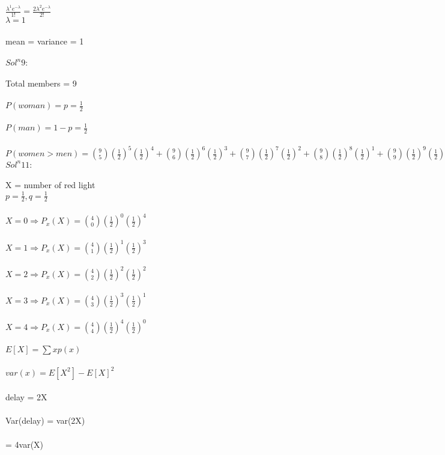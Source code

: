 \documentclass{article}
\begin{document}
$\frac{\lambda ^1 e^{-\lambda }}{1!} = \frac{2\lambda ^2 e^{-\lambda }}{2!}$\\

$\lambda =1$\\\\
mean = variance = 1 \\\\

\textbf{$Sol^n 9:$} \\\\
Total members = 9 \\\\
$P\left ( woman \right ) = p =\frac{1}{2}$ \\\\
$P\left ( man \right ) = 1-p =\frac{1}{2}$ \\\\
$P\left (women> men \right ) = \binom{9}{5}\left ( \frac{1}{2} \right )^5\left ( \frac{1}{2} \right )^4 + \binom{9}{6}\left ( \frac{1}{2} \right )^6\left ( \frac{1}{2} \right )^3 + \binom{9}{7}\left ( \frac{1}{2} \right )^7\left ( \frac{1}{2} \right )^2 + \binom{9}{8}\left ( \frac{1}{2} \right )^8\left ( \frac{1}{2} \right )^1 + \binom{9}{9}\left ( \frac{1}{2} \right )^9\left ( \frac{1}{2} \right )^0$ \\

\textbf{$Sol^n 11:$} \\\\
X = number of red light\\
$p = \frac{1}{2}, q = \frac{1}{2}$ \\\\
$X=0 \Rightarrow  P_x\left ( X \right ) = \binom{4}{0}\left ( \frac{1}{2} \right )^0\left ( \frac{1}{2} \right )^4$ \\\\
$X=1 \Rightarrow  P_x\left ( X \right ) = \binom{4}{1}\left ( \frac{1}{2} \right )^1\left ( \frac{1}{2} \right )^3$ \\\\
$X=2\Rightarrow  P_x\left ( X \right ) = \binom{4}{2}\left ( \frac{1}{2} \right )^2\left ( \frac{1}{2} \right )^2$ \\\\
$X=3\Rightarrow  P_x\left ( X \right ) = \binom{4}{3}\left ( \frac{1}{2} \right )^3\left ( \frac{1}{2} \right )^1$ \\\\
$X=4\Rightarrow  P_x\left ( X \right ) = \binom{4}{4}\left ( \frac{1}{2} \right )^4\left ( \frac{1}{2} \right )^0$ \\\\
$E[X] = \sum x p\left ( x \right )$\\\\
$var\left ( x \right ) = E[X^2] - {E[X]}^2$\\\\
delay = 2X \\\\
Var(delay) = var(2X) \\\\
= 4var(X) \\\\
\end{document}

